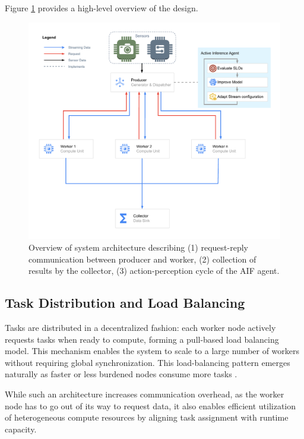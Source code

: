 Figure \ref{fig:methodology-parallel-distributed-pipeline} provides a high-level overview of the design.

\begin{figure}[htbp]
    \centering
    \includegraphics[width=\textwidth]{img/methodology/methodology_parallel_pipeline_overview.drawio.pdf}
    \caption{Overview of system architecture describing (1) request-reply communication between producer and worker, (2) collection of results by the collector, (3) action-perception cycle of the AIF agent.}
    \label{fig:methodology-parallel-distributed-pipeline}
\end{figure}


\subsection{Task Distribution and Load Balancing}
Tasks are distributed in a decentralized fashion: each worker node actively requests tasks when ready to compute, forming a pull-based load balancing model. This mechanism enables the system to scale to a large number of workers without requiring global synchronization. This load-balancing pattern emerges naturally as faster or less burdened nodes consume more tasks \cite{estrada_comparing_2015}.

While such an architecture increases communication overhead, as the worker node has to go out of its way to request data, it also enables efficient utilization of heterogeneous compute resources by aligning task assignment with runtime capacity.

